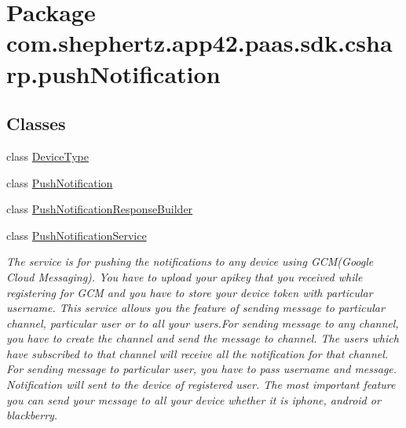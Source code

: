 \hypertarget{namespacecom_1_1shephertz_1_1app42_1_1paas_1_1sdk_1_1csharp_1_1push_notification}{\section{Package com.\+shephertz.\+app42.\+paas.\+sdk.\+csharp.\+push\+Notification}
\label{namespacecom_1_1shephertz_1_1app42_1_1paas_1_1sdk_1_1csharp_1_1push_notification}
}
\subsection*{Classes}
\begin{DoxyCompactItemize}
\item 
class \hyperlink{classcom_1_1shephertz_1_1app42_1_1paas_1_1sdk_1_1csharp_1_1push_notification_1_1_device_type}{Device\+Type}
\item 
class \hyperlink{classcom_1_1shephertz_1_1app42_1_1paas_1_1sdk_1_1csharp_1_1push_notification_1_1_push_notification}{Push\+Notification}
\item 
class \hyperlink{classcom_1_1shephertz_1_1app42_1_1paas_1_1sdk_1_1csharp_1_1push_notification_1_1_push_notification_response_builder}{Push\+Notification\+Response\+Builder}
\item 
class \hyperlink{classcom_1_1shephertz_1_1app42_1_1paas_1_1sdk_1_1csharp_1_1push_notification_1_1_push_notification_service}{Push\+Notification\+Service}
\begin{DoxyCompactList}\small\item\em The service is for pushing the notifications to any device using G\+C\+M(\+Google Cloud Messaging). You have to upload your apikey that you received while registering for G\+C\+M and you have to store your device token with particular username. This service allows you the feature of sending message to particular channel, particular user or to all your users.\+For sending message to any channel, you have to create the channel and send the message to channel. The users which have subscribed to that channel will receive all the notification for that channel. For sending message to particular user, you have to pass username and message. Notification will sent to the device of registered user. The most important feature you can send your message to all your device whether it is iphone, android or blackberry. \end{DoxyCompactList}\end{DoxyCompactItemize}
